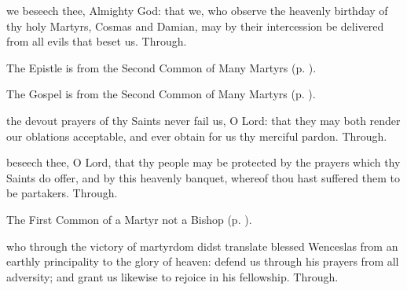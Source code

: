\collect
{} we beseech thee, Almighty God: that we, who observe the heavenly birthday of thy holy Martyrs, Cosmas and Damian, may by their intercession be delivered from all evils that beset us. Through.

\begin{rubric}
	The Epistle is from the Second Common of Many Martyrs (p. \pageref{CommonMartyrsIIEpistle}).
\end{rubric}


\begin{rubric}
	The Gospel is from the Second Common of Many Martyrs (p. \pageref{CommonMartyrsIIGospel}).
\end{rubric}


\secret
{} the devout prayers of thy Saints never fail us, O Lord: that they may both render our oblations acceptable, and ever obtain for us thy merciful pardon. Through.


\postcommunion
{} beseech thee, O Lord, that thy people may be protected by the prayers which thy Saints do offer, and by this heavenly banquet, whereof thou hast suffered them to be partakers. Through.



\begin{rubric}
	The First Common of a Martyr not a Bishop (p. \pageref{CommonMartyrNotBishopI}).
\end{rubric}

\collect
{} who through the victory of martyrdom didst translate blessed Wenceslas from an earthly principality to the glory of heaven: defend us through his prayers from all adversity; and grant us likewise to rejoice in his fellowship. Through.


